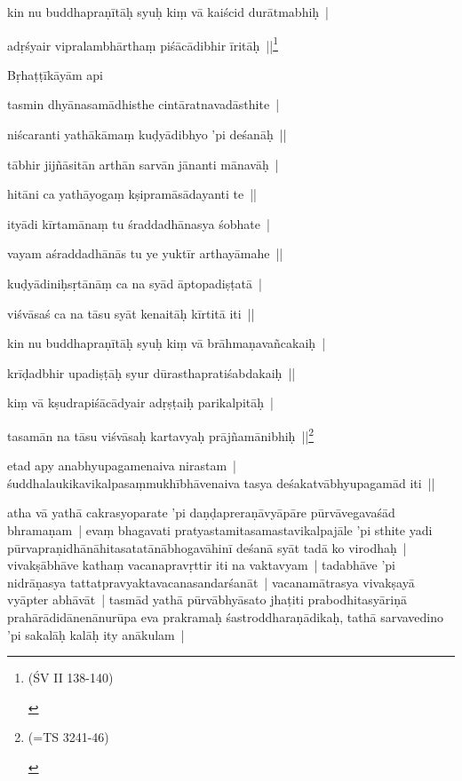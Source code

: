 \documentclass[article,12pt,a4paper]{memoir}
\begin{document}
	  \pstart kin nu buddhapraṇītāḥ syuḥ kiṃ vā kaiścid durātmabhiḥ | 
	\pend
      

	  \pstart adṛśyair vipralambhārthaṃ piśācādibhir īritāḥ ||\footnote{\begin{english}(ŚV II 138-140)\end{english}}
	\pend
      

	  \pstart Bṛhaṭṭīkāyām api 
	\pend
      

	  \pstart tasmin dhyānasamādhisthe cintāratnavadāsthite | 
	\pend
      

	  \pstart niścaranti yathākāmaṃ kuḍyādibhyo 'pi deśanāḥ || 
	\pend
      

	  \pstart tābhir jijñāsitān arthān sarvān jānanti mānavāḥ | 
	\pend
      

	  \pstart hitāni ca yathāyogaṃ kṣipramāsādayanti te || 
	\pend
      

	  \pstart ityādi kīrtamānaṃ tu śraddadhānasya śobhate | 
	\pend
      

	  \pstart vayam aśraddadhānās tu ye yuktīr arthayāmahe || 
	\pend
      

	  \pstart kuḍyādiniḥsṛtānāṃ ca na syād āptopadiṣṭatā | 
	\pend
      

	  \pstart viśvāsaś ca na tāsu syāt kenaitāḥ kīrtitā iti || 
	\pend
      

	  \pstart kin nu buddhapraṇītāḥ syuḥ kiṃ vā brāhmaṇavañcakaiḥ | 
	\pend
      

	  \pstart krīḍadbhir upadiṣṭāḥ syur dūrasthapratiśabdakaiḥ || 
	\pend
      

	  \pstart kiṃ vā kṣudrapiśācādyair adṛṣṭaiḥ parikalpitāḥ | 
	\pend
      

	  \pstart tasamān na tāsu viśvāsaḥ kartavyaḥ prājñamānibhiḥ ||\footnote{\begin{english}(=TS 3241-46)\end{english}}
	\pend
      

	  \pstart etad apy anabhyupagamenaiva nirastam | śuddhalaukikavikalpasaṃmukhībhāvenaiva tasya deśakatvābhyupagamād iti || 
	\pend
      

	  \pstart atha vā yathā cakrasyoparate 'pi daṇḍapreraṇāvyāpāre pūrvāvegavaśād bhramaṇam | evaṃ bhagavati pratyastamitasamastavikalpajāle 'pi sthite yadi pūrvapraṇidhānāhitasatatānābhogavāhinī deśanā syāt tadā ko virodhaḥ | vivakṣābhāve kathaṃ vacanapravṛttir iti na vaktavyam | tadabhāve 'pi nidrāṇasya tattatpravyaktavacanasandarśanāt | vacanamātrasya vivakṣayā vyāpter abhāvāt | tasmād yathā pūrvābhyāsato jhaṭiti prabodhitasyāriṇā prahārādidānenānurūpa eva prakramaḥ śastroddharaṇādikaḥ, tathā sarvavedino 'pi sakalāḥ kalāḥ ity anākulam | 
	\pend
      
\end{document}
